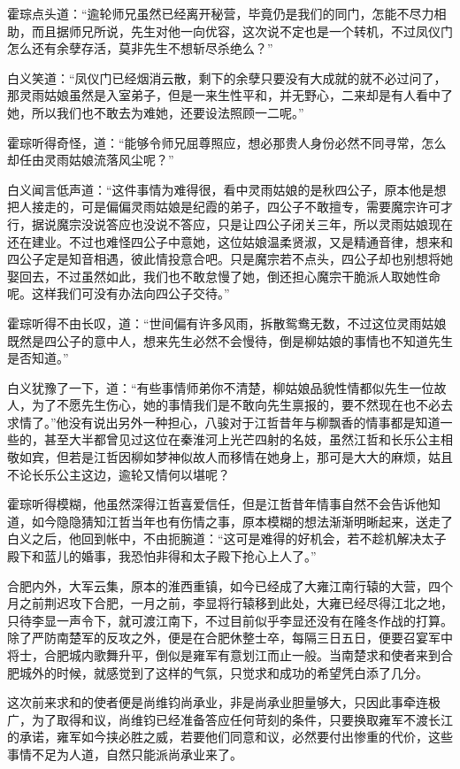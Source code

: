 霍琮点头道：“逾轮师兄虽然已经离开秘营，毕竟仍是我们的同门，怎能不尽力相助，而且据师兄所说，先生对他一向优容，这次说不定也是一个转机，不过凤仪门怎么还有余孽存活，莫非先生不想斩尽杀绝么？”

白义笑道：“凤仪门已经烟消云散，剩下的余孽只要没有大成就的就不必过问了，那灵雨姑娘虽然是入室弟子，但是一来生性平和，并无野心，二来却是有人看中了她，所以我们也不敢去为难她，还要设法照顾一二呢。”

霍琮听得奇怪，道：“能够令师兄屈尊照应，想必那贵人身份必然不同寻常，怎么却任由灵雨姑娘流落风尘呢？”

白义闻言低声道：“这件事情为难得很，看中灵雨姑娘的是秋四公子，原本他是想把人接走的，可是偏偏灵雨姑娘是纪霞的弟子，四公子不敢擅专，需要魔宗许可才行，据说魔宗没说答应也没说不答应，只是让四公子闭关三年，所以灵雨姑娘现在还在建业。不过也难怪四公子中意她，这位姑娘温柔贤淑，又是精通音律，想来和四公子定是知音相遇，彼此情投意合吧。只是魔宗若不点头，四公子却也别想将她娶回去，不过虽然如此，我们也不敢怠慢了她，倒还担心魔宗干脆派人取她性命呢。这样我们可没有办法向四公子交待。”

霍琮听得不由长叹，道：“世间偏有许多风雨，拆散鸳鸯无数，不过这位灵雨姑娘既然是四公子的意中人，想来先生必然不会慢待，倒是柳姑娘的事情也不知道先生是否知道。”

白义犹豫了一下，道：“有些事情师弟你不清楚，柳姑娘品貌性情都似先生一位故人，为了不愿先生伤心，她的事情我们是不敢向先生禀报的，要不然现在也不必去求情了。”他没有说出另外一种担心，八骏对于江哲昔年与柳飘香的情事都是知道一些的，甚至大半都曾见过这位在秦淮河上光芒四射的名妓，虽然江哲和长乐公主相敬如宾，但若是江哲因柳如梦神似故人而移情在她身上，那可是大大的麻烦，姑且不论长乐公主这边，逾轮又情何以堪呢？

霍琮听得模糊，他虽然深得江哲喜爱信任，但是江哲昔年情事自然不会告诉他知道，如今隐隐猜知江哲当年也有伤情之事，原本模糊的想法渐渐明晰起来，送走了白义之后，他回到帐中，不由扼腕道：“这可是难得的好机会，若不趁机解决太子殿下和蓝儿的婚事，我恐怕非得和太子殿下抢心上人了。”

合肥内外，大军云集，原本的淮西重镇，如今已经成了大雍江南行辕的大营，四个月之前荆迟攻下合肥，一月之前，李显将行辕移到此处，大雍已经尽得江北之地，只待李显一声令下，就可渡江南下，不过目前似乎李显还没有在隆冬作战的打算。除了严防南楚军的反攻之外，便是在合肥休整士卒，每隔三日五日，便要召宴军中将士，合肥城内歌舞升平，倒似是雍军有意划江而止一般。当南楚求和使者来到合肥城外的时候，就感觉到了这样的气氛，只觉求和成功的希望凭白添了几分。

这次前来求和的使者便是尚维钧尚承业，非是尚承业胆量够大，只因此事牵连极广，为了取得和议，尚维钧已经准备答应任何苛刻的条件，只要换取雍军不渡长江的承诺，雍军如今挟必胜之威，若要他们同意和议，必然要付出惨重的代价，这些事情不足为人道，自然只能派尚承业来了。


